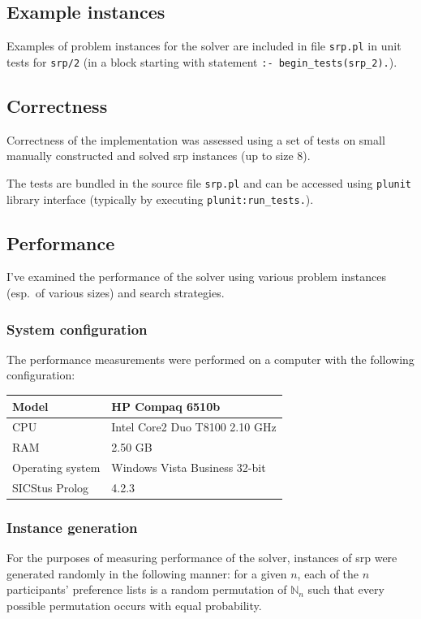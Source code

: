 \documentclass{article}
\newcommand{\nn}{\mathbb{N}_n}
\newcommand{\file}[1]{\texttt{#1}}
\newcommand{\code}[1]{\texttt{#1}}
\newcommand{\prolog}{Prolog}
\newcommand{\sicstusprolog}{SICStus \prolog{}}
\newcommand{\srp}{\acrshort{srp}}
\begin{document}
\subsection{Example instances}
Examples of problem instances for the solver are included in file \file{srp.pl}
in unit tests for \code{srp/2}
(in a block starting with statement \code{:- begin\_tests(srp\_2).}).

\subsection{Correctness}
Correctness of the implementation was assessed using a set of tests on small
manually constructed and solved \srp{} instances (up to size 8).

The tests are bundled in the source file \file{srp.pl}
and can be accessed using \code{plunit} library interface
(typically by executing \code{plunit:run\_tests.}).

\subsection{Performance}
I've examined the performance of the solver using various problem instances
(esp.~of various sizes) and search strategies.

\subsubsection{System configuration}
The performance measurements were performed on a computer
with the following configuration:

\begin{tabular}{| l | l |}
\hline
Model & HP Compaq 6510b \\
\hline
CPU & Intel Core2 Duo T8100 2.10 GHz \\
\hline
RAM & 2.50 GB \\
\hline
Operating system & Windows Vista Business 32-bit \\
\hline
\sicstusprolog{} & 4.2.3 \\
\hline
\end{tabular}

\subsubsection{Instance generation}
For the purposes of measuring performance of the solver,
instances of \acrshort{srp} were generated randomly in the following manner:
for a given $n$, each of the $n$ participants' preference lists
is a random permutation of $\nn$
such that every possible permutation occurs with equal probability.
\end{document}
